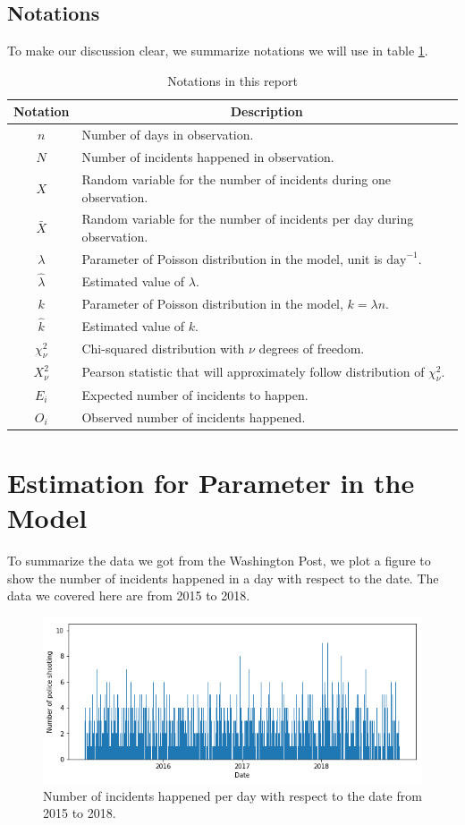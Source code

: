 \documentclass[11pt,a4paper,english]{article}
\begin{document}
\subsection{Notations}
To make our discussion clear, we summarize notations we will use in table \ref{tab:notation}.
\begin{table}[htbp]
	\centering
	\begin{tabular}{cl}
		\toprule
		Notation & \multicolumn{1}{c}{Description}\\
		\midrule
		$n$ & Number of days in observation.\\
		$N$ & Number of incidents happened in observation.\\
		$X$ & Random variable for the number of incidents during one observation.\\
		$\bar{X}$ & Random variable for the number of incidents per day during observation.\\
		$\lambda$ & Parameter of Poisson distribution in the model, unit is $\text{day}^{-1}$.\\
		$\hat{\lambda}$ & Estimated value of $\lambda$.\\
		$k$ & Parameter of Poisson distribution in the model, $k = \lambda n$.\\
		$\hat{k}$ & Estimated value of $k$.\\
		$\chi_{\nu}^{2}$ & Chi-squared distribution with $\nu$ degrees of freedom.\\
		$X^{2}_{\nu}$ & Pearson statistic that will approximately follow distribution of $\chi^{2}_{\nu}$.\\
		$E_{i}$ & Expected number of incidents to happen.\\
		$O_{i}$ & Observed number of incidents happened.\\
		\bottomrule
	\end{tabular}
	\caption{Notations in this report}
	\label{tab:notation}
\end{table}

\section{Estimation for Parameter in the Model}
To summarize the data we got from the Washington Post, we plot a figure to show the number of incidents happened in a day with respect to the date. The data we covered here are from 2015 to 2018.
\begin{figure}[htbp]
	\centering
	\includegraphics[width = \textwidth]{1.png}
    \caption{Number of incidents happened per day with respect to the date from 2015 to 2018.}
\end{figure}
\end{document}
